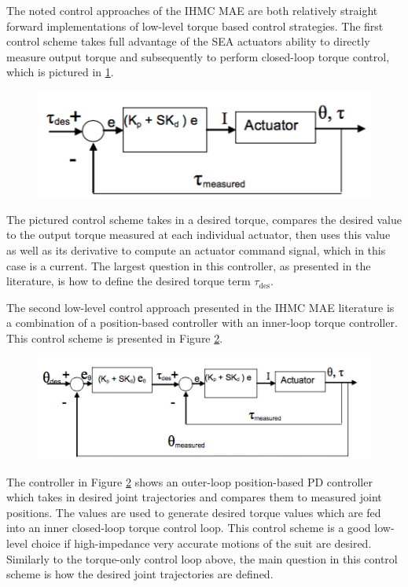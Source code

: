  The noted control approaches of the IHMC MAE are both relatively straight forward implementations of low-level torque based control strategies.  The first control scheme takes full advantage of the SEA actuators ability to directly measure output torque and subsequently to perform closed-loop torque control, which is pictured in \ref{fig:IHMCTOR}.     
  \begin{figure}[thpb]
\centering
\includegraphics[width=3.in]{exos/figs/ihmc/torqueCon}
  \caption{}
  \vspace{-0.2in}
 \label{fig:IHMCTOR}   
 \end{figure}
 The pictured control scheme takes in a desired torque, compares the desired value to the output torque measured at each individual actuator, then uses this value as well as its derivative to compute an actuator command signal, which in this case is a current.  The largest question in this controller, as presented in the literature, is how to define the desired torque term $\tau_\text{des}$.
 
 The second low-level control approach presented in the IHMC MAE literature is a combination of a position-based controller with an inner-loop torque controller.  This control scheme is presented in Figure \ref{fig:IHMCPOS}.
  \begin{figure}[thpb]
\centering
\includegraphics[width=3.in]{exos/figs/ihmc/positionCon}
  \caption{}
  \vspace{-0.2in}
 \label{fig:IHMCPOS}   
 \end{figure}
 The controller in Figure \ref{fig:IHMCPOS} shows an outer-loop position-based PD controller which takes in desired joint trajectories and compares them to measured joint positions.  The values are used to generate desired torque values which are fed into an inner closed-loop torque control loop.  This control scheme is a good low-level choice if high-impedance very accurate motions of the suit are desired.  Similarly to the torque-only control loop above, the main question in this control scheme is how the desired joint trajectories are defined.  
 
